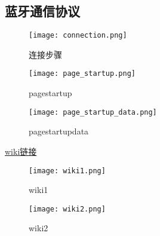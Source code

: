 \subsection{蓝牙通信协议}
\begin{figure}[H]
\centering
\texttt{[image: connection.png]}
\caption{连接步骤}
\label{fig:connection}
\end{figure}

\begin{figure}[H]
\centering
\texttt{[image: page\_startup.png]}
\caption{pagestartup}
\label{fig:pagestartup}
\end{figure}

\begin{figure}[H]
\centering
\texttt{[image: page\_startup\_data.png]}
\caption{pagestartupdata}
\label{fig:page_startup_data}
\end{figure}

\href{https://en.wikipedia.org/wiki/Diffie%E2%80%93Hellman_key_exchange}{wiki链接}
\begin{figure}[H]
\centering
\texttt{[image: wiki1.png]}
\caption{wiki1}
\label{fig:wiki1}
\end{figure}

\begin{figure}[H]
\centering
\texttt{[image: wiki2.png]}
\caption{wiki2}
\label{fig:wiki2}
\end{figure}
